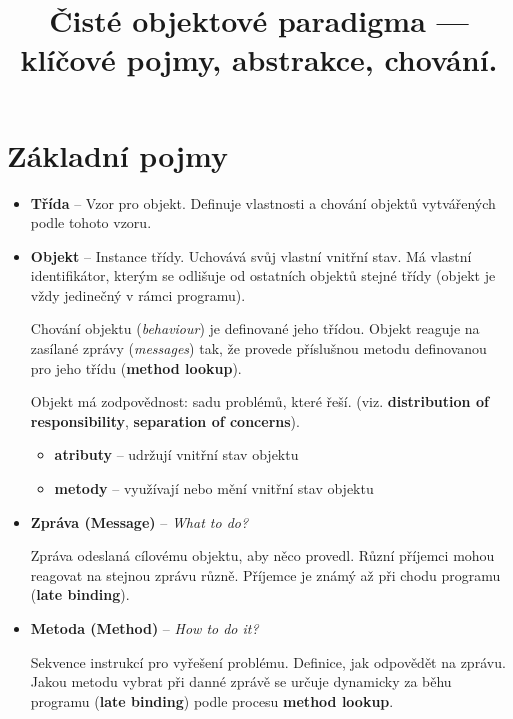 \documentclass{szzclass}
\title{Čisté objektové paradigma — klíčové pojmy, abstrakce, chování.}
\begin{document}
\maketitle

\tableofcontents
\newpage

\section{Základní pojmy}

\begin{itemize}
      \item \textbf{Třída} -- Vzor pro objekt. Definuje vlastnosti a chování objektů vytvářených podle tohoto vzoru.
      \item \textbf{Objekt} -- Instance třídy. Uchovává svůj vlastní vnitřní stav. Má vlastní identifikátor,
      kterým se odlišuje od ostatních objektů stejné třídy (objekt je vždy jedinečný v rámci programu).

      Chování objektu (\textit{behaviour}) je definované jeho třídou. Objekt reaguje na zasílané zprávy
      (\textit{messages}) tak, že provede příslušnou metodu definovanou pro jeho třídu (\textbf{method lookup}).

      Objekt má zodpovědnost: sadu problémů, které řeší. (viz. \textbf{distribution of responsibility}, \textbf{separation of concerns}).

      \begin{itemize}
            \item \textbf{atributy} -- udržují vnitřní stav objektu
            \item \textbf{metody} -- využívají nebo mění vnitřní stav objektu
      \end{itemize}

      \item \textbf{Zpráva (Message)} -- \textit{What to do?}

      Zpráva odeslaná cílovému objektu, aby něco provedl. Různí příjemci mohou reagovat na stejnou zprávu různě.
      Příjemce je známý až při chodu programu (\textbf{late binding}).

      \item \textbf{Metoda (Method)} -- \textit{How to do it?}

      Sekvence instrukcí pro vyřešení problému. Definice, jak odpovědět na zprávu.
      Jakou metodu vybrat při danné zprávě se určuje dynamicky za běhu programu (\textbf{late binding}) podle procesu \textbf{method lookup}.

\end{itemize}
\end{document}
